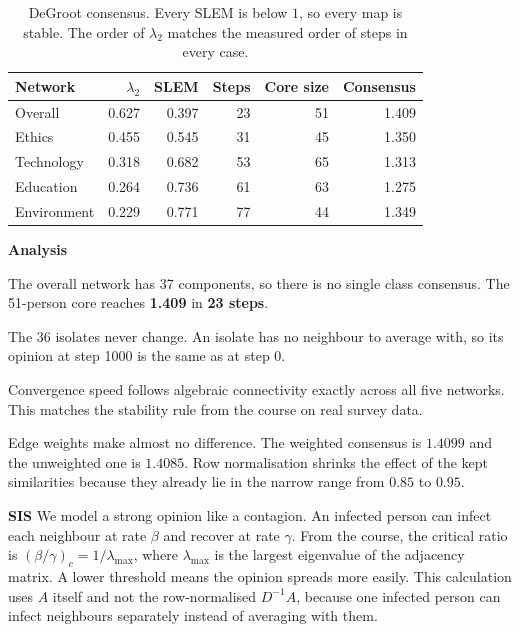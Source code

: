 \documentclass[11pt,a4paper]{article}
\newcommand{\gc}[1]{\cellcolor{hi}#1}
\newcommand{\rc}[1]{\cellcolor{lo}#1}
\newcommand{\lab}[1]{\textbf{#1}}
\begin{document}
\begin{table}[!ht]
\centering\small
\begin{tabular}{@{}lrrrrr@{}}
\toprule
\sffamily\bfseries Network & \sffamily $\lambda_2$ & \sffamily SLEM &
\sffamily Steps & \sffamily Core size & \sffamily Consensus \\
\midrule
Overall     & \gc{0.627} & \gc{0.397} & \gc{23} & 51 & 1.409 \\
Ethics      & 0.455 & 0.545 & 31 & 45 & 1.350 \\
Technology  & 0.318 & 0.682 & 53 & \gc{65} & 1.313 \\
Education   & 0.264 & 0.736 & 61 & 63 & \rc{1.275} \\
Environment & \rc{0.229} & \rc{0.771} & \rc{77} & \rc{44} & 1.349 \\
\bottomrule
\end{tabular}
\caption{DeGroot consensus. Every SLEM is below $1$, so every map is stable.
The order of $\lambda_2$ matches the measured order of steps in every case.}
\label{tab:degroot}
\end{table}

\lab{Analysis}
\begin{dash}
  \item The overall network has 37 components, so there is no single class
  consensus. The 51-person core reaches \textbf{1.409} in \textbf{23 steps}.
  \item The 36 isolates never change. An isolate has no neighbour to average
  with, so its opinion at step 1000 is the same as at step 0.
  \item Convergence speed follows algebraic connectivity exactly across all five
  networks. This matches the stability rule from the course on real survey
  data.
  \item Edge weights make almost no difference. The weighted consensus is
  $1.4099$ and the unweighted one is $1.4085$. Row normalisation shrinks the
  effect of the kept similarities because they already lie in the narrow range
  from $0.85$ to $0.95$.
\end{dash}

\lab{SIS} We model a strong opinion like a contagion. An infected person can
infect each neighbour at rate $\beta$ and recover at rate $\gamma$. From the
course, the critical ratio is $(\beta/\gamma)_c = 1/\lambda_{\max}$, where
$\lambda_{\max}$ is the largest eigenvalue of the adjacency matrix. A lower
threshold means the opinion spreads more easily. This calculation uses $A$
itself and not the row-normalised $D^{-1}A$, because one infected person can
infect neighbours separately instead of averaging with them.
\end{document}
